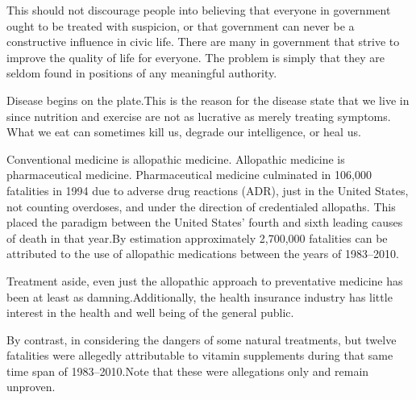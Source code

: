 This should not discourage people into believing that everyone in government ought to be treated with suspicion, or that government can never be a constructive influence in civic life. There are many in government that strive to improve the quality of life for everyone. The problem is simply that they are seldom found in positions of any meaningful authority.


Disease begins on the plate. This is the reason for the disease state that we live in since nutrition and exercise are not as lucrative as merely treating symptoms. What we eat can sometimes kill us,
degrade our intelligence,
or heal us.
\footnotecite[cavusoglu2009]

Conventional medicine is allopathic medicine. Allopathic medicine is pharmaceutical medicine. Pharmaceutical medicine culminated in 106,000 fatalities in 1994 due to adverse drug reactions (ADR), just in the United States, not counting overdoses, and under the direction of credentialed allopaths. This placed the paradigm between the United States' fourth and sixth leading causes of death in that year. By estimation approximately 2,700,000 fatalities can be attributed to the use of allopathic medications between the years of 1983--2010.\footnotecite[leape2000] 

Treatment aside, even just the allopathic approach to preventative medicine has been at least as damning. Additionally, the health insurance industry has little interest in the health and well being of the general public.

By contrast, in considering the dangers of some natural treatments, but twelve fatalities were allegedly attributable to vitamin supplements during that same time span of 1983--2010. Note that these were allegations only and remain unproven. 


